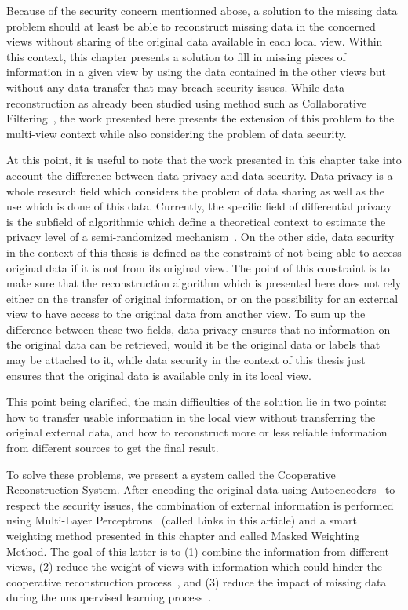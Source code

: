 Because of the security concern mentionned abose, a solution to the missing data problem should at least be able to reconstruct missing data in the concerned views without sharing of the original data available in each local view.	Within this context, this chapter presents a solution to fill in missing pieces of information in a given view by using the data contained in the other views but without any data transfer that may breach security issues. While data reconstruction as already been studied using method such as Collaborative Filtering~\cite{koren2015advances}, the work presented here presents the extension of this problem to the multi-view context while also considering the problem of data security.

At this point, it is useful to note that the work presented in this chapter take into account the difference between data privacy and data security. Data privacy is a whole research field which considers the problem of data sharing as well as the use which is done of this data. Currently, the specific field of differential privacy is the subfield of algorithmic which define a theoretical context to estimate the privacy level of a semi-randomized mechanism~\cite{dwork2010differential}. On the other side, data security in the context of this thesis is defined as the constraint of not being able to access original data if it is not from its original view. The point of this constraint is to make sure that the reconstruction algorithm which is presented here does not rely either on the transfer of original information, or on the possibility for an external view to have access to the original data from another view. To sum up the difference between these two fields, data privacy ensures that no information on the original data can be retrieved, would it be the original data or labels that may be attached to it, while data security in the context of this thesis just ensures that the original data is available only in its local view.

This point being clarified, the main difficulties of the solution lie in two points: how to transfer usable information in the local view without transferring the original external data, and how to reconstruct more or less reliable information from different sources to get the final result.

To solve these problems, we present a system called the Cooperative Reconstruction System. After encoding the original data using Autoencoders~\cite{hinton2006reducing} to respect the security issues, the combination of external information is performed using Multi-Layer Perceptrons~\cite{rumelhart1985learning} (called Links in this article) and a smart weighting method presented in this chapter and called Masked Weighting Method. The goal of this latter is to (1) combine the information from different views, (2) reduce the weight of views with information which could hinder the cooperative reconstruction process~\cite{sublime2018youpi}, and (3) reduce the impact of missing data during the unsupervised learning process~\cite{DBLP:journals/bmcbi/SoutoJC15}.


